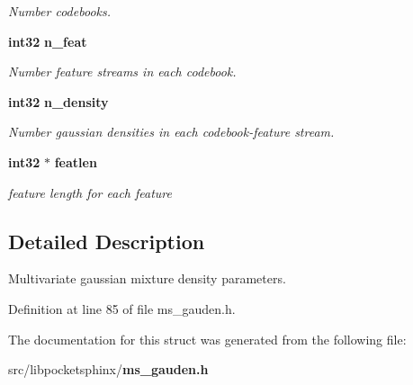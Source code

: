 \begin{DoxyCompactItemize}
\begin{DoxyCompactList}\small\item\em \-Number codebooks. \end{DoxyCompactList}\item 
{\bf int32} {\bf n\-\_\-feat}\label{structgauden__t_a6dea221962b4a278dbae4806925a7be0}

\begin{DoxyCompactList}\small\item\em \-Number feature streams in each codebook. \end{DoxyCompactList}\item 
{\bf int32} {\bf n\-\_\-density}\label{structgauden__t_ab5104d8fa59bc94b12b36104dd4c19ac}

\begin{DoxyCompactList}\small\item\em \-Number gaussian densities in each codebook-\/feature stream. \end{DoxyCompactList}\item 
{\bf int32} $\ast$ {\bf featlen}\label{structgauden__t_aca099d830de926e628ac0b523046b32c}

\begin{DoxyCompactList}\small\item\em feature length for each feature \end{DoxyCompactList}\end{DoxyCompactItemize}


\subsection{\-Detailed \-Description}
\-Multivariate gaussian mixture density parameters. 

\-Definition at line 85 of file ms\-\_\-gauden.\-h.



\-The documentation for this struct was generated from the following file\-:\begin{DoxyCompactItemize}
\item 
src/libpocketsphinx/{\bf ms\-\_\-gauden.\-h}\end{DoxyCompactItemize}
